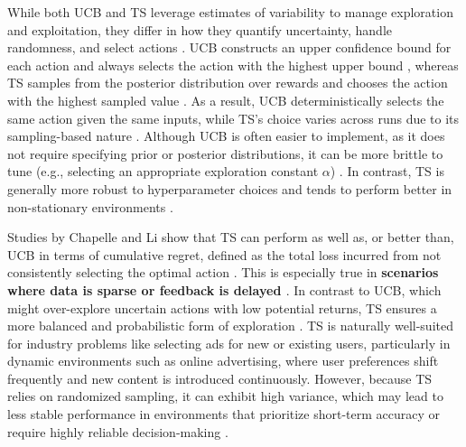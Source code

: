 \documentclass[final]{anthology-ch}         %
\begin{document}
While both UCB and TS leverage estimates of variability to manage exploration and exploitation, they differ in how they quantify uncertainty, handle randomness, and select actions \cite{Sutton1998, russo2018tutorial}. UCB constructs an upper confidence bound for each action and always selects the action with the highest upper bound \cite{auer2002finite}, whereas TS samples from the posterior distribution over rewards and chooses the action with the highest sampled value \cite{russo2018tutorial}. As a result, UCB deterministically selects the same action given the same inputs, while TS’s choice varies across runs due to its sampling-based nature \cite{russo2018tutorial}. Although UCB is often easier to implement, as it does not require specifying prior or posterior distributions, it can be more brittle to tune (e.g., selecting an appropriate exploration constant $\alpha$) \cite{Sutton1998, auer2002finite}. In contrast, TS is generally more robust to hyperparameter choices and tends to perform better in non-stationary environments \cite{chapelle2011empirical, russo2018tutorial}.

Studies by Chapelle and Li \cite{chapelle2011empirical} show that TS can perform as well as, or better than, UCB in terms of cumulative regret, defined as the total loss incurred from not consistently selecting the optimal action \cite{chapelle2011empirical, russo2018tutorial}. This is especially true in \textbf{scenarios where data is sparse or feedback is delayed \cite{chapelle2011empirical}}. In contrast to UCB, which might over-explore uncertain actions with low potential returns, TS ensures a more balanced and probabilistic form of exploration \cite{russo2018tutorial}. TS is naturally well-suited for industry problems like selecting ads for new or existing users, particularly in dynamic environments such as online advertising, where user preferences shift frequently and new content is introduced continuously. However, because TS relies on randomized sampling, it can exhibit high variance, which may lead to less stable performance in environments that prioritize short-term accuracy or require highly reliable decision-making \cite{russo2018tutorial}.
\end{document}
